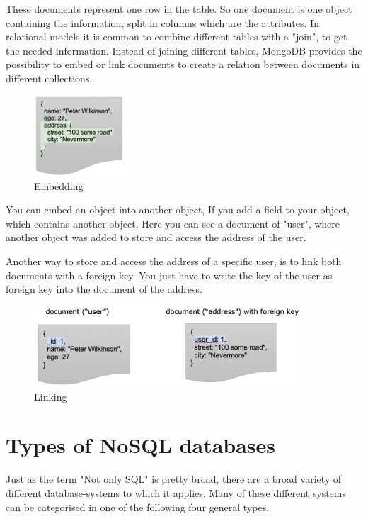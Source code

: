 \documentclass[11pt]{article}
\begin{document}
These documents represent one row in the table. So one document is one object containing the information, split in columns which are the attributes. In relational models it is common to combine different tables with a "join", to get the needed information.
Instead of joining different tables, MongoDB provides the possibility to embed or link documents to create a relation between documents in different collections.    

	\begin{figure}[H]
		\centering 
		\includegraphics[height=3cm]{figures/embedded-address}     
		\caption{Embedding}           
	\end{figure}    

You can embed an object into another object,
If you add a field to your object, 
which contains another object.
Here you can see a document of "user",
where another object was added
to store and access the address of the user. 

Another way to store and access the address of a specific user, is to link both documents with a foreign key. You just have to write the key of the user as foreign key into the document of the address.


	\begin{figure}[H]
		\centering  
		\includegraphics[height=3cm]{figures/linking}     
		\caption{Linking}           
	\end{figure}     

 
\section{Types of NoSQL databases} 
Just as the term "Not only SQL" is pretty broad, there are a broad variety of different database-systems to which it applies.
Many of these different systems can be categorised in one of the following four general types. \cite{nosqllist}
\end{document}
